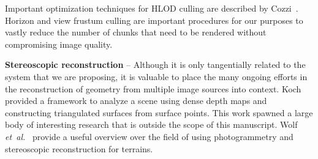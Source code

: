 \documentclass[journal]{vgtc}                %
\newcommand{\etal}{\emph{et~al.}}
\begin{document}

Important optimization techniques for HLOD culling are described by Cozzi~\cite{cozzi2008visibility}. Horizon and view frustum culling are important procedures for our purposes to vastly reduce the number of chunks that need to be rendered without compromising image quality.




\noindent\textbf{Stereoscopic reconstruction} -- Although it is only tangentially related to the system that we are proposing, it is valuable to place the many ongoing efforts in the reconstruction of geometry from multiple image sources into context. Koch \cite{Koch95} provided a framework to analyze a scene using dense depth maps and constructing triangulated surfaces from surface points. This work spawned a large body of interesting research that is outside the scope of this manuscript. Wolf \etal~\cite{wolf2000elements} provide a useful overview over the field of using photogrammetry and stereoscopic reconstruction for terrains.
\end{document}
